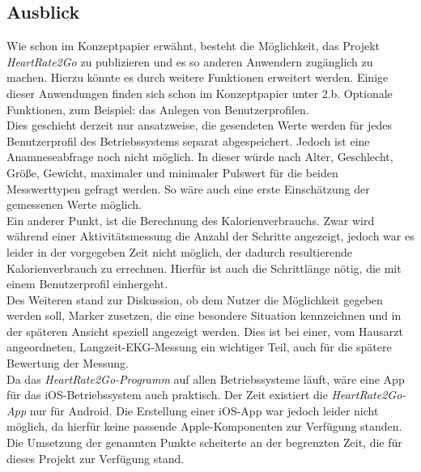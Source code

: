 \subsection{Ausblick} \label{sec:Ausblick}
Wie schon im Konzeptpapier erwähnt, besteht die Möglichkeit, das Projekt \textit{HeartRate2Go} zu publizieren und es so anderen Anwendern zugänglich zu machen. Hierzu könnte es durch weitere Funktionen erweitert werden. Einige dieser Anwendungen finden sich schon im Konzeptpapier unter 2.b. Optionale Funktionen, zum Beispiel: das Anlegen von Benutzerprofilen. \\ Dies geschieht derzeit nur ansatzweise, die gesendeten Werte werden für jedes Benutzerprofil des Betriebssystems separat abgespeichert. Jedoch ist eine Anamneseabfrage noch nicht möglich. In dieser würde nach Alter, Geschlecht, Größe, Gewicht, maximaler und minimaler Pulswert für die beiden Messwerttypen gefragt werden. So wäre auch eine erste Einschätzung der gemessenen Werte möglich.
\\
Ein anderer Punkt, ist die Berechnung des Kalorienverbrauchs. Zwar wird während einer Aktivitätsmessung die Anzahl der Schritte angezeigt, jedoch war es leider in der vorgegeben Zeit nicht möglich, der dadurch resultierende Kalorienverbrauch zu errechnen. Hierfür ist auch die Schrittlänge nötig, die mit einem Benutzerprofil einhergeht. \\
Des Weiteren stand zur Diskussion, ob dem Nutzer die Möglichkeit gegeben werden soll, Marker zusetzen, die eine besondere Situation kennzeichnen und in der späteren Ansicht speziell angezeigt werden. Dies ist bei einer, vom Hausarzt angeordneten, Langzeit-EKG-Messung ein wichtiger Teil, auch für die spätere Bewertung der Messung. \\
Da das \textit{HeartRate2Go-Programm} auf allen Betriebssysteme läuft, wäre eine App für das iOS-Betriebssystem auch praktisch. Der Zeit existiert die \textit{HeartRate2Go-App} nur für Android. Die Erstellung einer iOS-App war jedoch leider nicht möglich, da hierfür keine passende Apple-Komponenten zur Verfügung standen.\\
Die Umsetzung der genannten Punkte scheiterte an der begrenzten Zeit, die für dieses Projekt zur Verfügung stand. \\

